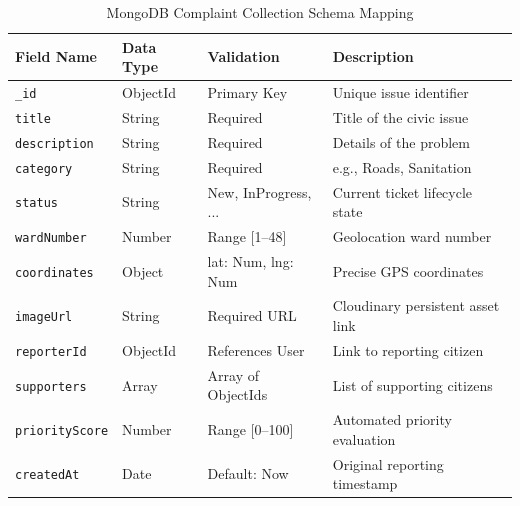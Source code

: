 \documentclass[conference]{IEEEtran}
\begin{document}
\begin{table}[htbp]
\centering
\caption{MongoDB Complaint Collection Schema Mapping}
\label{tab:complaint_schema}
\begin{tabularx}{\columnwidth}{l l l X}
\toprule
Field Name & Data Type & Validation & Description \\
\midrule
\texttt{\_id} & ObjectId & Primary Key & Unique issue identifier \\
\texttt{title} & String & Required & Title of the civic issue \\
\texttt{description} & String & Required & Details of the problem \\
\texttt{category} & String & Required & e.g., Roads, Sanitation \\
\texttt{status} & String & New, InProgress, ... & Current ticket lifecycle state \\
\texttt{wardNumber} & Number & Range [1--48] & Geolocation ward number \\
\texttt{coordinates} & Object & lat: Num, lng: Num & Precise GPS coordinates \\
\texttt{imageUrl} & String & Required URL & Cloudinary persistent asset link \\
\texttt{reporterId} & ObjectId & References User & Link to reporting citizen \\
\texttt{supporters} & Array & Array of ObjectIds & List of supporting citizens \\
\texttt{priorityScore} & Number & Range [0--100] & Automated priority evaluation \\
\texttt{createdAt} & Date & Default: Now & Original reporting timestamp \\
\bottomrule
\end{tabularx}
\end{table}
\end{document}
